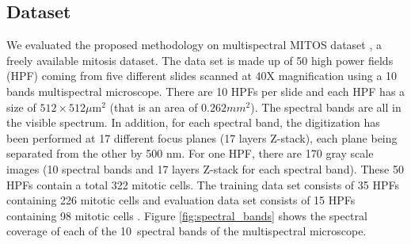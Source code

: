 \documentclass[10pt,twocolumn,letterpaper]{article}
\begin{document}
\subsection{Dataset}
We evaluated the proposed methodology on multispectral MITOS dataset \cite{mITOS2012}, a freely available mitosis dataset. The data set is made up of 50 high power fields (HPF) coming from five different slides scanned at 40X magnification using a 10 bands multispectral microscope. There are 10 HPFs per slide and each HPF has a size of $512\times512\mu\text{m}^2$ (that is an area of $0.262mm^2$). The spectral bands are all in the visible spectrum. In addition, for each spectral band, the digitization has been performed at 17 different focus planes (17 layers Z-stack), each plane being separated from the other by 500 nm. For one HPF, there are 170 gray scale images (10 spectral bands and 17 layers Z-stack for each spectral band). These 50 HPFs contain a total 322 mitotic cells. The training data set consists of 35 HPFs containing 226 mitotic cells and evaluation data set consists of 15 HPFs containing 98 mitotic cells \cite{roux2013}. Figure \ref{fig:spectral_bands} shows the spectral coverage of each of the 10~spectral bands of the multispectral microscope.
\end{document}

